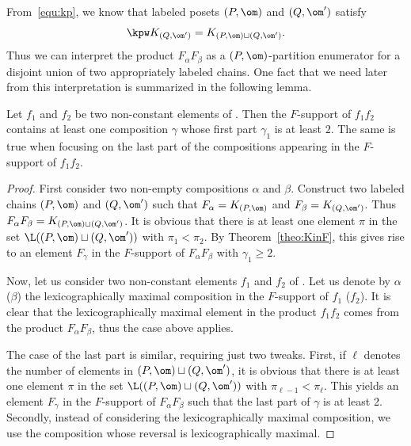 From~\eqref{equ:kp}, we know that labeled posets $(P,\om)$ and $(Q,\om')$  satisfy 
\[
\kpw K_{(Q,\om')} = K_{(P,\om) \sqcup (Q,\om')}.
\]
Thus we can interpret the product $F_\alpha F_\beta$ as a $(P,\om)$-partition enumerator for a disjoint union of two appropriately labeled chains.  One fact that we need later from this interpretation is summarized in the following lemma.

\begin{lemma}\label{lem:deg2}
Let $f_1$ and $f_2$ be two non-constant elements of \qsym.
Then the $F$-support of $f_1 f_2$ contains at least one composition $\gamma$ whose first part $\gamma_1$ is at least $2$.
The same is true when focusing on the last part of the compositions appearing in the $F$-support of $f_1 f_2$.
\end{lemma}
\begin{proof}
First consider two non-empty compositions $\alpha$ and $\beta$.  Construct two labeled chains $(P,\om)$ and $(Q,\om')$ such that $F_\alpha=K_{(P,\om)}$ and $F_\beta=K_{(Q,\om')}$.  Thus $F_\alpha F_\beta = K_{(P,\om) \sqcup (Q,\om')}$.  It is obvious that there is at least one element $\pi$ in the set $\L((P,\om) \sqcup (Q,\om'))$ with $\pi_1<\pi_2$.  By Theorem~\ref{theo:KinF}, this gives rise to an element $F_\gamma$ in the $F$-support of $F_\alpha F_\beta$ with $\gamma_1\ge2$.

Now, let us consider two non-constant elements $f_1$ and $f_2$ of \qsym.
Let us denote by $\alpha$ (\resp $\beta$) the lexicographically maximal composition in the $F$-support of $f_1$ (\resp $f_2$).
It is clear that the lexicographically maximal element in the product $f_1 f_2$ comes from the product $F_\alpha F_\beta$,
thus the case above applies.

The case of the last part is similar, requiring just two tweaks.  First, if $\ell$ denotes the number of elements in $(P,\om) \sqcup (Q,\om')$, it is obvious that there is at least one element $\pi$ in the set $\L((P,\om) \sqcup (Q,\om'))$ with $\pi_{\ell-1}<\pi_\ell$.   This yields an element $F_\gamma$ in the $F$-support of $F_\alpha F_\beta$ such that the last part of $\gamma$ is at least 2. Secondly, instead of considering the lexicographically maximal composition, we use the composition whose reversal is lexicographically maximal.
\end{proof}

